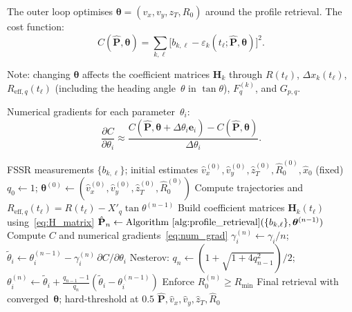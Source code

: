 \documentclass[11pt,a4paper]{article}
\begin{document}
The outer loop optimises $\bm{\theta}=(v_x,v_y,z_T,R_0)$ around the
profile retrieval.  The cost function:
\begin{equation}
  C(\hat{\mathbf{P}},\bm{\theta})
  = \sum_{k,\ell}\bigl[b_{k,\ell}
  - \varepsilon_k(t_\ell;\hat{\mathbf{P}},\bm{\theta})\bigr]^2.
  \label{eq:cost_joint}
\end{equation}

Note: changing $\bm{\theta}$ affects the coefficient matrices
$\mathbf{H}_k$ through $R(t_\ell)$, $\Delta x_k(t_\ell)$,
$R_{\mathrm{eff},q}(t_\ell)$ (including the heading angle~$\theta$ in
$\tan\theta$), $F_q^{(k)}$, and $G_{p,q}$.

Numerical gradients for each parameter~$\theta_i$:
\begin{equation}
  \frac{\partial C}{\partial\theta_i}
  \approx
  \frac{C(\hat{\mathbf{P}},\bm{\theta}{+}\Delta\theta_i\mathbf{e}_i)
  - C(\hat{\mathbf{P}},\bm{\theta})}{\Delta\theta_i}.
  \label{eq:num_grad}
\end{equation}

\begin{algorithm}[H]
\caption{Joint shadow profile and motion parameter estimation}
\label{alg:joint_estimation}
\begin{algorithmic}[1]
\Require FSSR measurements $\{b_{k,\ell}\}$; initial estimates
$\hat{v}_x^{(0)},\hat{v}_y^{(0)},\hat{z}_T^{(0)},\hat{R}_0^{(0)},
\hat{x}_0$ (fixed)
\State $q_0\leftarrow 1$;
$\bm{\theta}^{(0)}\leftarrow
(\hat{v}_x^{(0)},\hat{v}_y^{(0)},\hat{z}_T^{(0)},\hat{R}_0^{(0)})$
  \State Compute trajectories and
    $R_{\mathrm{eff},q}(t_\ell)=R(t_\ell)-X'_q\tan\theta^{(n-1)}$
  \State Build coefficient matrices
    $\mathbf{H}_k(t_\ell)$ using~\eqref{eq:H_matrix}
  \State $\hat{\mathbf{P}}_n \leftarrow
    \text{Algorithm~\ref{alg:profile_retrieval}}
    (\{b_{k,\ell}\},\bm{\theta}^{(n-1)})$
  \State Compute $C$ and numerical gradients~\eqref{eq:num_grad}
  \State $\gamma_i^{(n)}\leftarrow\gamma_i/n$;\quad
    $\tilde{\theta}_i \leftarrow \theta_i^{(n-1)}
    - \gamma_i^{(n)}\,\partial C/\partial\theta_i$
  \State Nesterov:
    $q_n\leftarrow(1{+}\sqrt{1{+}4q_{n-1}^2})/2$;\quad
    $\theta_i^{(n)}\leftarrow\tilde{\theta}_i
    +\tfrac{q_{n-1}-1}{q_n}(\tilde{\theta}_i{-}\theta_i^{(n-1)})$
  \State Enforce $R_0^{(n)}\ge R_{\min}$
\EndFor
\State Final retrieval with converged~$\bm{\theta}$; hard-threshold at
$0.5$
\State \Return
  $\hat{\mathbf{P}},\hat{v}_x,\hat{v}_y,\hat{z}_T,\hat{R}_0$
\end{algorithmic}
\end{algorithm}
\end{document}
